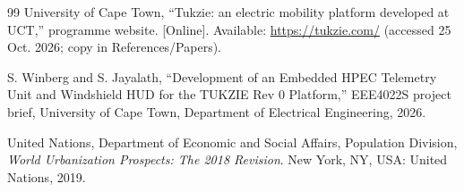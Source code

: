 
\begin{thebibliography}{99}
 University of Cape Town, ``Tukzie: an electric mobility platform developed at UCT,'' programme website. [Online]. Available: \url{https://tukzie.com/} (accessed 25 Oct. 2026; copy in References/Papers).

 S. Winberg and S. Jayalath, ``Development of an Embedded HPEC Telemetry Unit and Windshield HUD for the TUKZIE Rev 0 Platform,'' EEE4022S project brief, University of Cape Town, Department of Electrical Engineering, 2026.

 United Nations, Department of Economic and Social Affairs, Population Division, \emph{World Urbanization Prospects: The 2018 Revision}. New York, NY, USA: United Nations, 2019.


\end{thebibliography}
